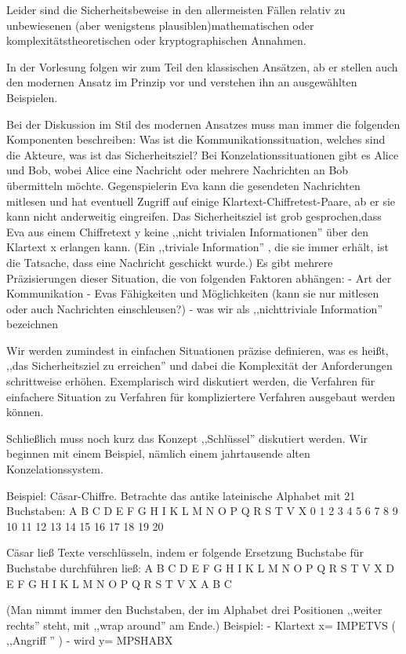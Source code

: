 \documentclass[a4paper]{article}
\begin{document}
\begin{multicols}{3}
Leider sind die Sicherheitsbeweise in den allermeisten Fällen relativ zu unbewiesenen (aber wenigstens plausiblen)mathematischen oder komplexitätstheoretischen oder kryptographischen Annahmen.

In der Vorlesung folgen wir zum Teil den klassischen Ansätzen, ab er stellen auch den modernen Ansatz im Prinzip vor und verstehen ihn an ausgewählten Beispielen.

Bei der Diskussion im Stil des modernen Ansatzes muss man immer die folgenden Komponenten beschreiben: Was ist die Kommunikationssituation, welches sind die Akteure, was ist das Sicherheitsziel? Bei Konzelationssituationen gibt es Alice und Bob, wobei Alice eine Nachricht oder mehrere Nachrichten an Bob übermitteln möchte. Gegenspielerin Eva kann die gesendeten Nachrichten mitlesen und hat eventuell Zugriff auf einige Klartext-Chiffretest-Paare, ab er sie kann nicht anderweitig eingreifen. Das Sicherheitsziel ist grob gesprochen,dass Eva aus einem Chiffretext y keine ,,nicht trivialen Informationen''  über den Klartext x erlangen kann. (Ein ,,triviale Information'' , die sie immer erhält, ist die Tatsache, dass eine Nachricht geschickt wurde.) Es gibt mehrere Präzisierungen dieser Situation, die von folgenden Faktoren abhängen:
- Art der Kommunikation
- Evas Fähigkeiten und Möglichkeiten (kann sie nur mitlesen oder auch Nachrichten einschleusen?)
- was wir als ,,nichttriviale Information'' bezeichnen

Wir werden zumindest in einfachen Situationen präzise definieren, was es heißt, ,,das Sicherheitsziel zu erreichen'' und dabei die Komplexität der Anforderungen schrittweise erhöhen.
Exemplarisch wird diskutiert werden, die Verfahren für einfachere Situation zu Verfahren für kompliziertere Verfahren ausgebaut werden können.

Schließlich muss noch kurz das Konzept ,,Schlüssel''  diskutiert werden. Wir beginnen mit einem Beispiel, nämlich einem jahrtausende alten Konzelationssystem.

Beispiel: Cäsar-Chiffre. Betrachte das antike lateinische Alphabet mit 21 Buchstaben:
    A B C D E F G H I K L M N O P Q R S T V X
    0 1 2 3 4 5 6 7 8 9 10 11 12 13 14 15 16 17 18 19 20

Cäsar ließ Texte verschlüsseln, indem er folgende Ersetzung Buchstabe für Buchstabe durchführen ließ:
    A B C D E F G H I K L M N O P Q R S T V X
    D E F G H I K L M N O P Q R S T V X A B C

(Man nimmt immer den Buchstaben, der im Alphabet drei Positionen ,,weiter rechts'' steht, mit ,,wrap around'' am Ende.)
Beispiel:
- Klartext x= IMPETVS ( ,,Angriff '' )
- wird y= MPSHABX
 

\end{multicols}
\end{document}

